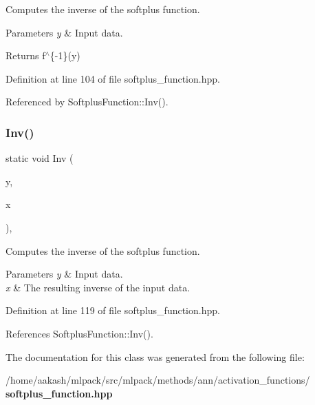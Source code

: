 Computes the inverse of the softplus function. 


\begin{DoxyParams}{Parameters}
{\em y} & Input data. \\
\hline
\end{DoxyParams}
\begin{DoxyReturn}{Returns}
f$^\wedge$\{-\/1\}(y) 
\end{DoxyReturn}


Definition at line 104 of file softplus\+\_\+function.\+hpp.



Referenced by Softplus\+Function\+::\+Inv().

\mbox{\label{classmlpack_1_1ann_1_1SoftplusFunction_a3ea6c0a5538ecd48a07d3e2043a7a43b}} 
\subsubsection{Inv()\hspace{0.1cm}{\footnotesize\ttfamily [2/2]}}
{\footnotesize\ttfamily static void Inv (\begin{DoxyParamCaption}\item[{const Input\+Type \&}]{y,  }\item[{Output\+Type \&}]{x }\end{DoxyParamCaption})\hspace{0.3cm}{\ttfamily [inline]}, {\ttfamily [static]}}



Computes the inverse of the softplus function. 


\begin{DoxyParams}{Parameters}
{\em y} & Input data. \\
\hline
{\em x} & The resulting inverse of the input data. \\
\hline
\end{DoxyParams}


Definition at line 119 of file softplus\+\_\+function.\+hpp.



References Softplus\+Function\+::\+Inv().



The documentation for this class was generated from the following file\+:\begin{DoxyCompactItemize}
\item 
/home/aakash/mlpack/src/mlpack/methods/ann/activation\+\_\+functions/\textbf{ softplus\+\_\+function.\+hpp}\end{DoxyCompactItemize}
